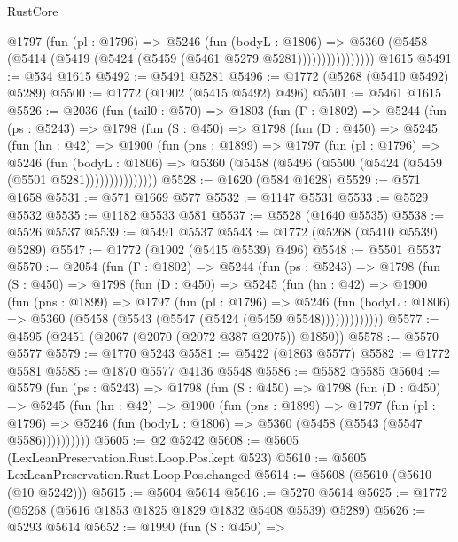 \begin{lexlean}{RustCore}
\begin{coremodule}
                  @1797
                    (fun (pl : @1796) =>
                    @5246
                      (fun (bodyL : @1806) =>
                      @5360 (@5458 (@5414 (@5419 (@5424 (@5459 (@5461 @5279 @5281))))))))))))))))
    @1615
@5491 := @534 @1615
@5492 := @5491 @5281
@5496 := @1772 (@5268 (@5410 @5492) @5289)
@5500 := @1772 (@1902 (@5415 @5492) @496)
@5501 := @5461 @1615
@5526 := @2036
    (fun (tail0 : @570) =>
    @1803
      (fun (Γ : @1802) =>
      @5244
        (fun (ps : @5243) =>
        @1798
          (fun (S : @450) =>
          @1798
            (fun (D : @450) =>
            @5245
              (fun (hn : @42) =>
              @1900
                (fun (pns : @1899) =>
                @1797
                  (fun (pl : @1796) =>
                  @5246
                    (fun (bodyL : @1806) =>
                    @5360 (@5458 (@5496 (@5500 (@5424 (@5459 (@5501 @5281)))))))))))))))
@5528 := @1620 (@584 @1628)
@5529 := @571 @1658
@5531 := @571 @1669 @577
@5532 := @1147 @5531
@5533 := @5529 @5532
@5535 := @1182 @5533 @581
@5537 := @5528 (@1640 @5535)
@5538 := @5526 @5537
@5539 := @5491 @5537
@5543 := @1772 (@5268 (@5410 @5539) @5289)
@5547 := @1772 (@1902 (@5415 @5539) @496)
@5548 := @5501 @5537
@5570 := @2054
    (fun (Γ : @1802) =>
    @5244
      (fun (ps : @5243) =>
      @1798
        (fun (S : @450) =>
        @1798
          (fun (D : @450) =>
          @5245
            (fun (hn : @42) =>
            @1900
              (fun (pns : @1899) =>
              @1797
                (fun (pl : @1796) =>
                @5246
                  (fun (bodyL : @1806) =>
                  @5360 (@5458 (@5543 (@5547 (@5424 (@5459 @5548)))))))))))))
@5577 := @4595 (@2451 (@2067 (@2070 (@2072 @387 @2075)) @1850))
@5578 := @5570 @5577
@5579 := @1770 @5243
@5581 := @5422 (@1863 @5577)
@5582 := @1772 @5581
@5585 := @1870 @5577 @4136 @5548
@5586 := @5582 @5585
@5604 := @5579
    (fun (ps : @5243) =>
    @1798
      (fun (S : @450) =>
      @1798
        (fun (D : @450) =>
        @5245
          (fun (hn : @42) =>
          @1900
            (fun (pns : @1899) =>
            @1797
              (fun (pl : @1796) =>
              @5246 (fun (bodyL : @1806) => @5360 (@5458 (@5543 (@5547 @5586))))))))))
@5605 := @2 @5242
@5608 := @5605 (LexLeanPreservation.Rust.Loop.Pos.kept @523)
@5610 := @5605 LexLeanPreservation.Rust.Loop.Pos.changed
@5614 := @5608 (@5610 (@5610 (@10 @5242)))
@5615 := @5604 @5614
@5616 := @5270 @5614
@5625 := @1772 (@5268 (@5616 @1853 @1825 @1829 @1832 @5408 @5539) @5289)
@5626 := @5293 @5614
@5652 := @1990
    (fun (S : @450) =>

\end{coremodule}
\end{lexlean}
